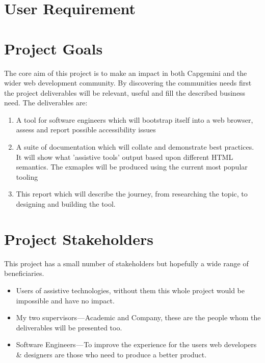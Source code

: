 
\section{User Requirement}


\section{Project Goals}
The core aim of this project is to make an impact in both Capgemini and the
wider web development community. By discovering the communities needs first
the project deliverables will be relevant, useful and fill the described
business need. The deliverables are:
\begin{enumerate}
  \item A tool for software engineers which will bootstrap itself into a web
browser, assess and report possible accessibility issues
  \item A suite of documentation which will collate and demonstrate best
practices. It will show what 'assistive tools' output based upon different
HTML semantics. The exmaples will be produced using the current most popular
tooling
  \item This report which will describe the journey, from researching the
topic, to designing and building the tool.
\end{enumerate}

\section{Project Stakeholders}
This project has a small number of stakeholders but hopefully a wide range of
 beneficiaries.
\begin{itemize}
  \item Users of assistive technologies, without them this whole project would be impossible and have no impact.
  \item My two supervisors — Academic and Company, these are the people whom
  the deliverables will be presented too.
  \item Software Engineers — To improve the experience for the users
  web developers \& designers are those who need to produce a better product.
\end{itemize}

